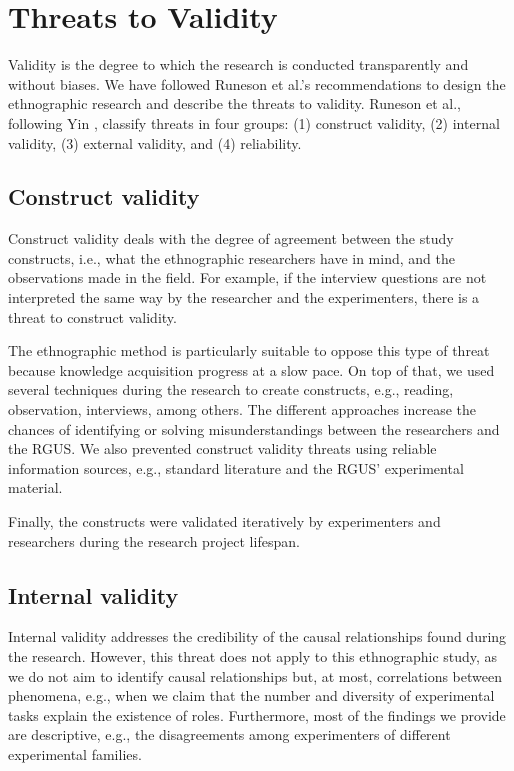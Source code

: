 \section{Threats to Validity}\label{sec-threats}
Validity is the degree to which the research is conducted transparently and without biases. We have followed Runeson et al.'s recommendations \cite[p. 71–73]{Runenson-2012-case-study-SE} to design the ethnographic research and describe the threats to validity. Runeson et al., following Yin \cite{Yin-2009-case-study}, classify threats in four groups: (1) construct validity, (2) internal validity, (3) external validity, and (4) reliability.

\subsection{Construct validity}
Construct validity deals with the degree of agreement between the study constructs, i.e., what the ethnographic researchers have in mind, and the observations made in the field. For example, if the interview questions are not interpreted the same way by the researcher and the experimenters, there is a threat to construct validity. 

The ethnographic method is particularly suitable to oppose this type of threat because knowledge acquisition progress at a slow pace. On top of that, we used several techniques during the research to create constructs, e.g., reading, observation, interviews, among others. The different approaches increase the chances of identifying or solving misunderstandings between the researchers and the RGUS. We also prevented construct validity threats using reliable information sources, e.g., standard literature and the RGUS' experimental material. 

Finally, the constructs were validated iteratively by experimenters and researchers during the research project lifespan.

\subsection{Internal validity}
Internal validity addresses the credibility of the causal relationships found during the research. However, this threat does not apply to this ethnographic study, as we do not aim to identify causal relationships but, at most, correlations between phenomena, e.g., when we claim that the number and diversity of experimental tasks explain the existence of roles. Furthermore, most of the findings we provide are descriptive, e.g., the disagreements among experimenters of different experimental families.

